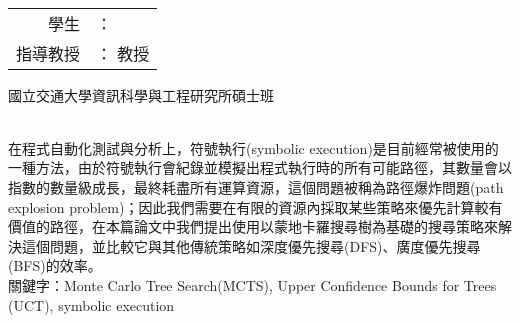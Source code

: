 \begin{titlepage}
  \begin{center}
  	\LARGE 
    \begin{singlespace}    
      \textbf{\chineseTitle{}} \\[0.5cm]
    \end{singlespace}
    
    \begin{singlespace}    
    \begin{tabular}{r l}
    	學生     & ：\studentCnName{}  \\
        指導教授  & ：\advisorCnName{} \hspace{0.1cm} 教授 \\[0.5cm]
    \end{tabular}
    \end{singlespace}

    國立交通大學資訊科學與工程研究所碩士班 \\[0.5cm]
     \\[0.5cm]
    	
  \end{center}
  \normalsize 
  \hspace{0.6cm} 在程式自動化測試與分析上，符號執行(symbolic execution)是目前經常被使用的一種方法，由於符號執行會紀錄並模擬出程式執行時的所有可能路徑，其數量會以指數的數量級成長，最終耗盡所有運算資源，這個問題被稱為路徑爆炸問題(path explosion problem)；因此我們需要在有限的資源內採取某些策略來優先計算較有價值的路徑，在本篇論文中我們提出使用以蒙地卡羅搜尋樹為基礎的搜尋策略來解決這個問題，並比較它與其他傳統策略如深度優先搜尋(DFS)、廣度優先搜尋(BFS)的效率。
  \\[0.7cm]
  關鍵字：Monte Carlo Tree Search(MCTS), Upper Confidence Bounds for Trees (UCT), symbolic execution
\end{titlepage}